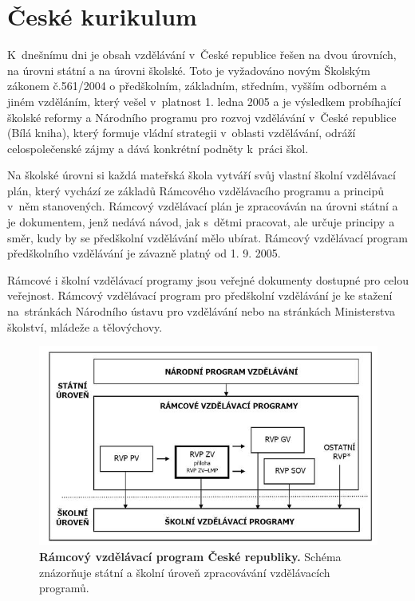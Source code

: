 	\section{České kurikulum}

		K dnešnímu dni je obsah vzdělávání v České republice řešen na dvou úrovních, na úrovni státní a na úrovni školské. Toto je vyžadováno novým Školským zákonem č.561/2004 o předškolním, základním, středním, vyšším odborném a jiném vzděláním, který vešel v platnost 1. ledna 2005 a je výsledkem probíhající školské reformy a Národního programu pro rozvoj vzdělávání v České republice (Bílá kniha), který formuje vládní strategii v oblasti vzdělávání, odráží celospolečenské zájmy a dává konkrétní podněty k práci škol.

		Na školské úrovni si každá mateřská škola vytváří svůj vlastní školní vzdělávací plán, který vychází ze základů Rámcového vzdělávacího programu a principů v něm stanovených. Rámcový vzdělávací plán je zpracováván na úrovni státní a je dokumentem, jenž nedává návod, jak s dětmi pracovat, ale určuje principy a směr, kudy by se předškolní vzdělávání mělo ubírat. Rámcový vzdělávací program předškolního vzdělávání je závazně platný od 1. 9. 2005.

		Rámcové i školní vzdělávací programy jsou veřejné dokumenty dostupné pro celou veřejnost. Rámcový vzdělávací program pro předškolní vzdělávání je ke stažení na stránkách Národního ústavu pro vzdělávání \citep{RVP} nebo na stránkách Ministerstva školství, mládeže a tělovýchovy.

		
		\begin{figure}[h!t]
			\center
			\includegraphics[width=0.8\linewidth]{fotky/rvpCR.jpg}
			\caption{\textbf{Rámcový vzdělávací program České republiky.}
				Schéma znázorňuje státní a školní úroveň zpracovávání vzdělávacích programů.
			}
			\label{obr:rvpCR}
		\end{figure}


